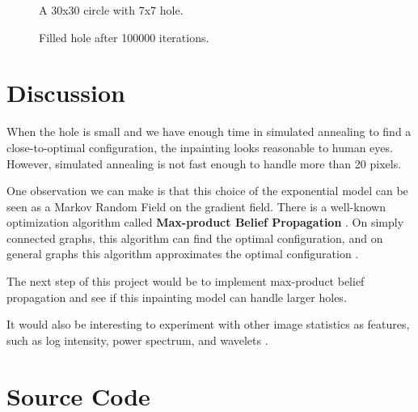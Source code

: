 \documentclass[11pt,letterpaper]{article}
\begin{document}
\begin{figure}[H]
  \centering
  \begin{minipage}[b]{0.45\textwidth}
  \begin{center}
    \caption{A 30x30 circle with 7x7 hole.}
  \end{center}
  \end{minipage}
  \hfill
   \begin{minipage}[b]{0.45\textwidth}
   \begin{center}
    \caption{Filled hole after 100000 iterations.}
    \end{center}
  \end{minipage}
\end{figure}

\section{Discussion}

When the hole is small and we have enough time in simulated annealing to find a close-to-optimal configuration, the inpainting looks reasonable to human eyes. However, simulated annealing is not fast enough to handle more than 20 pixels.

One observation we can make is that this choice of the exponential model can be seen as a Markov Random Field on the gradient field. There is a well-known optimization algorithm called \textbf{Max-product Belief Propagation} \cite{weiss2001optimality}. On simply connected graphs, this algorithm can find the optimal configuration, and on general graphs this algorithm approximates the optimal configuration \cite{weiss2001optimality}.

The next step of this project would be to implement max-product belief propagation and see if this inpainting model can handle larger holes.

It would also be interesting to experiment with other image statistics as features, such as log intensity, power spectrum, and wavelets \cite{pouli2011survey}. 

 


\appendix

\section*{Source Code}

\end{document}
